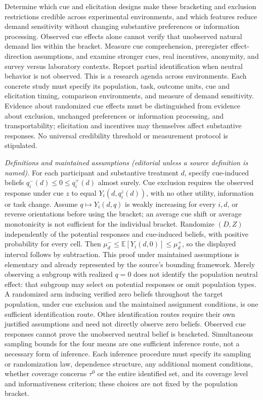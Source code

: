 \documentclass[11pt,a4paper]{article}
\begin{document}
Determine which cue and elicitation designs make these bracketing and exclusion restrictions credible across experimental environments, and which features reduce demand sensitivity without changing substantive preferences or information processing. Observed cue effects alone cannot verify that unobserved natural demand lies within the bracket. Measure cue comprehension, preregister effect-direction assumptions, and examine stronger cues, real incentives, anonymity, and survey versus laboratory contexts. Report partial identification when neutral behavior is not observed. This is a research agenda across environments. Each concrete study must specify its population, task, outcome units, cue and elicitation timing, comparison environments, and measure of demand sensitivity. Evidence about randomized cue effects must be distinguished from evidence about exclusion, unchanged preferences or information processing, and transportability; elicitation and incentives may themselves affect substantive responses. No universal credibility threshold or measurement protocol is stipulated.

\emph{Definitions and maintained assumptions (editorial unless a source definition is named).} For each participant and substantive treatment \(d\), specify cue-induced beliefs \(q_i^-(d)\le0\le q_i^+(d)\) almost surely. Cue exclusion requires the observed response under cue \(z\) to equal \(Y_i(d,q_i^z(d))\), with no other utility, information or task change. Assume \(q\mapsto Y_i(d,q)\) is weakly increasing for every \(i,d\), or reverse orientations before using the bracket; an average cue shift or average monotonicity is not sufficient for the individual bracket. Randomize \((D,Z)\) independently of the potential responses and cue-induced beliefs, with positive probability for every cell. Then \(\mu_d^-\le\mathbb E[Y_i(d,0)]\le\mu_d^+\), so the displayed interval follows by subtraction. This proof under maintained assumptions is elementary and already represented by the source’s bounding framework. Merely observing a subgroup with realized \(q=0\) does not identify the population neutral effect: that subgroup may select on potential responses or omit population types. A randomized arm inducing verified zero beliefs throughout the target population, under cue exclusion and the maintained assignment conditions, is one sufficient identification route. Other identification routes require their own justified assumptions and need not directly observe zero beliefs. Observed cue responses cannot prove the unobserved neutral belief is bracketed. Simultaneous sampling bounds for the four means are one sufficient inference route, not a necessary form of inference. Each inference procedure must specify its sampling or randomization law, dependence structure, any additional moment conditions, whether coverage concerns \(\tau^0\) or the entire identified set, and its coverage level and informativeness criterion; these choices are not fixed by the population bracket.
\end{document}
